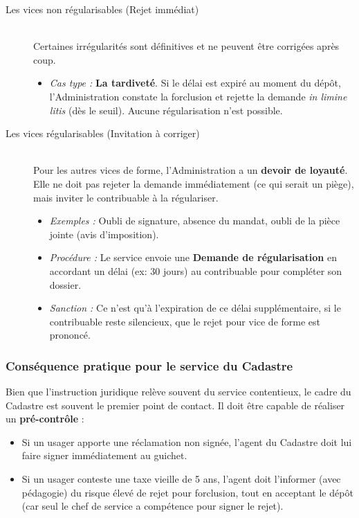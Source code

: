 \documentclass[Cours_contentieuxTF2026.tex]{subfiles}
\begin{document}
\begin{description}
	\item[Les vices non régularisables (Rejet immédiat)] \hfill \\
	Certaines irrégularités sont définitives et ne peuvent être corrigées après coup.
	\begin{itemize}
		\item \textit{Cas type :} \textbf{La tardiveté}. Si le délai est expiré au moment du dépôt, l'Administration constate la forclusion et rejette la demande \textit{in limine litis} (dès le seuil). Aucune régularisation n'est possible.
	\end{itemize}
	
	\item[Les vices régularisables (Invitation à corriger)] \hfill \\
	Pour les autres vices de forme, l'Administration a un \textbf{devoir de loyauté}. Elle ne doit pas rejeter la demande immédiatement (ce qui serait un piège), mais inviter le contribuable à la régulariser.
	\begin{itemize}
		\item \textit{Exemples :} Oubli de signature, absence du mandat, oubli de la pièce jointe (avis d'imposition).
		\item \textit{Procédure :} Le service envoie une \textbf{Demande de régularisation} en accordant un délai (ex: 30 jours) au contribuable pour compléter son dossier.
		\item \textit{Sanction :} Ce n'est qu'à l'expiration de ce délai supplémentaire, si le contribuable reste silencieux, que le rejet pour vice de forme est prononcé.
	\end{itemize}
\end{description}



\subsubsection{Conséquence pratique pour le service du Cadastre}

Bien que l'instruction juridique relève souvent du service contentieux, le cadre du Cadastre est souvent le premier point de contact. Il doit être capable de réaliser un \textbf{pré-contrôle} :

\begin{itemize}[label=\tiny$\blacksquare$]
	\item Si un usager apporte une réclamation non signée, l'agent du Cadastre doit lui faire signer immédiatement au guichet.
	\item Si un usager conteste une taxe vieille de 5 ans, l'agent doit l'informer (avec pédagogie) du risque élevé de rejet pour forclusion, tout en acceptant le dépôt (car seul le chef de service a compétence pour signer le rejet).
\end{itemize}
\end{document}
